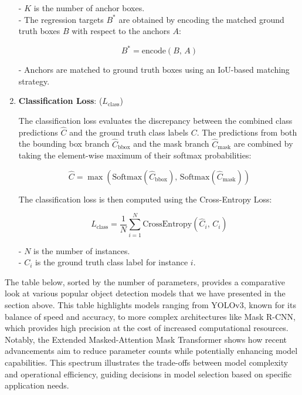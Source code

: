 \begin{enumerate}
    - \( K \) is the number of anchor boxes. \\ 
    - The regression targets \( B^* \) are obtained by encoding the matched ground truth boxes \( B \) with respect to the anchors \( A \):
    
      \[
      B^* = \text{encode}\left( B, \, A \right)
      \]
    
    - Anchors are matched to ground truth boxes using an IoU-based matching strategy.

    \item \textbf{Classification Loss}: (\( L_{\text{class}} \))

    The classification loss evaluates the discrepancy between the combined class predictions \( \hat{C} \) and the ground truth class labels \( C \). 
    The predictions from both the bounding box branch \( \hat{C}_{\text{bbox}} \) and the mask branch \( \hat{C}_{\text{mask}} \) are combined by 
    taking the element-wise maximum of their softmax probabilities:
    
    \[
    \hat{C} = \max\left( \text{Softmax}\left( \hat{C}_{\text{bbox}} \right), \, \text{Softmax}\left( \hat{C}_{\text{mask}} \right) \right)
    \]
    
    The classification loss is then computed using the Cross-Entropy Loss:
    
    \[
    L_{\text{class}} = \frac{1}{N} \sum_{i=1}^{N} \text{CrossEntropy}\left( \hat{C}_i, \, C_i \right)
    \]
    
    - \( N \) is the number of instances. \\
    - \( C_i \) is the ground truth class label for instance \( i \).
\end{enumerate}
















\newpage

The table below, sorted by the number of parameters, provides a comparative look at various popular object detection models that we have presented in the 
section above. This table highlights models ranging from YOLOv3, known for its balance of speed and accuracy, to more complex architectures like Mask R-CNN, 
which provides high precision at the cost of increased computational resources. Notably, the Extended Masked-Attention Mask Transformer shows how recent 
advancements aim to reduce parameter counts while potentially enhancing model capabilities. This spectrum illustrates the trade-offs between model complexity 
and operational efficiency, guiding decisions in model selection based on specific application needs.

